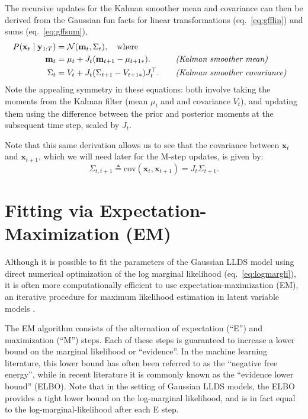 \documentclass[10pt]{article}
\newcommand{\vx}{\mathbf{x}}
\newcommand{\vy}{\mathbf{y}}
\newcommand{\vm}{\mathbf{m}}
\newcommand{\cov}{\mathrm{cov}}
\begin{document}
The recursive updates for the Kalman smoother mean and covariance can
then be derived from the Gaussian fun facts for linear transformations
(eq.~\ref{eq:gfflin}) and sums (eq.~\ref{eq:gffsum}),
\begin{alignat}{2}
  \label{eq:ks}
  P(\vx_t \mid \vy_{1:T} ) &= \Nrm(\vm_t,\Sigma_t),  \quad
  \text{where}\\
  \label{eq:ksmean}
    \vm_t &=  \mu_t + J_t(\vm_{t+1} - \mu_{t+1*}).
    \quad  & & \text{\it (Kalman smoother mean)} \\
      \label{eq:kscov}
  \Sigma_t &=V_t +  J_t (\Sigma_{t+1}-V_{t+1*}) J_t \trp.
\quad  & & \text{\it
  (Kalman smoother covariance)}
\end{alignat}
Note the appealing symmetry in these equations: both involve taking the moments from the Kalman filter (mean $\mu_t$ and and covariance $V_t$), and updating them using the difference between the prior and posterior moments at the subsequent time step, scaled by $J_t$. 

Note that this same derivation allows us to see that the covariance
between $\vx_t$ and $\vx_{t+1}$, which we will need later for the M-step
updates, is given by:
\begin{equation}
  \label{eq:kscrosscov}
  \Sigma_{t,t+1} \triangleq \cov(\vx_t,\vx_{t+1}) = J_t \Sigma_{t+1}. 
\end{equation}


\section{Fitting via Expectation-Maximization (EM)}

Although it is possible to fit the parameters of the Gaussian LLDS
model using direct numerical optimization of the log marginal
likelihood (eq.~\ref{eq:logmargli}), it is often more computationally
efficient to use expectation-maximization (EM), an iterative procedure
for maximum likelihood estimation in latent variable models
\cite{Dempster77}.

The EM algorithm consists of the alternation of expectation (``E'')
and maximization (``M'') steps. Each of these steps is guaranteed to
increase a lower bound on the marginal likelihood or ``evidence''.  In
the machine learning literature, this lower bound has often
been referred to as the ``negative free energy'', while in recent
literature it is commonly known as the ``evidence lower bound'' (ELBO). Note that in the setting of Gaussian LLDS models, the ELBO provides a tight lower bound on the log-marginal likelihood, and is in fact equal to the log-marginal-likelihood after each E step.
\end{document}
